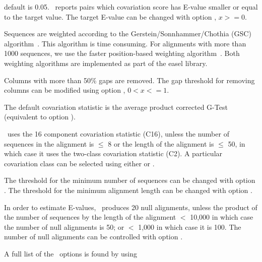 \begin{sreitems}{}
\item[\emprog{Target E-value:}]default is 0.05. \rscape\, reports
  pairs which covariation score has E-value smaller or equal to the
  target value.  The target E-value can be changed with option
  , $x >= 0$.

\item[\emprog{Sequence weighting:}]Sequences are weighted according to
  the Gerstein/Sonnhammer/Chothia (GSC)
  algorithm~\citep{Gerstein94}. This algorithm is time consuming. For
  alignments with more than 1000 sequences, we use the faster
  position-based weighting algorithm~\citep{Henikoff94b}. Both
  weighting algorithms are implemented as part of the easel library.

\item[\emprog{Gaps in columns:}]Columns with more than 50\% gaps are
  removed. The gap threshold for removing columns can be modified
   using option  , $0<x<=1$.

 \item[\emprog{Covariation statistic:}]The default covariation statistic
   is the average product corrected G-Test (equivalent to option
   ).

 \item[\emprog{Covariation Class:}]\rscape\ uses the 16 component
   covariation statistic (C16), unless the number of sequences in the
   alignment is $\leq$ 8 or the length of the alignment is $\leq$ 50,
   in which case it uses the two-class covariation statistic (C2). A
   particular covariation class can be selected using either
    or .

   The threshold for the minimum number of sequences can be changed
   with option .  The threshold for the minimum
   alignment length can be changed with option .

 \item[\emprog{Null alignments:}]In order to estimate E-values,
   \rscape\ produces 20 null alignments, unless the product of the
   number of sequences by the length of the alignment $<$ 10,000 in
   which case the number of null alignments is 50; or $<$ 1,000 in
   which case it is 100. The number of null alignments can be
   controlled with option .
 \end{sreitems}

 A full list of the \rscape\ options is found by using


 
 
